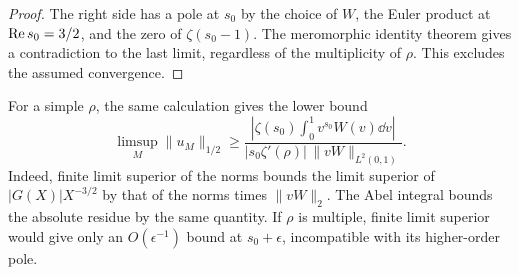 \begin{proof}
The right side has a pole at \(s_0\) by the choice of \(W\), the Euler product at \(\operatorname{Re} s_0=3/2\), and the zero of \(\zeta(s_0-1)\). The meromorphic identity theorem gives a contradiction to the last limit, regardless of the multiplicity of \(\rho\). This excludes the assumed convergence.
\end{proof}

For a simple \(\rho\), the same calculation gives the lower bound
\[
 \limsup_M\|u_M\|_{1/2}\ge
 \frac{|\zeta(s_0)\int_0^1 v^{s_0}W(v)\dd v|}
 {|s_0\zeta'(\rho)|\,\|vW\|_{L^2(0,1)}} .
\]
Indeed, finite limit superior of the norms bounds the limit superior of \(|G(X)|X^{-3/2}\) by that of the norms times \(\|vW\|_2\). The Abel integral bounds the absolute residue by the same quantity. If \(\rho\) is multiple, finite limit superior would give only an \(O(\epsilon^{-1})\) bound at \(s_0+\epsilon\), incompatible with its higher-order pole.

